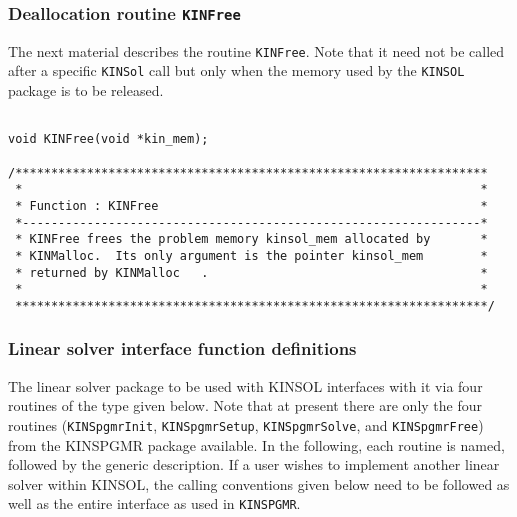 \documentclass[11pt]{article}
\begin{document}
\subsubsection{Deallocation routine {\tt KINFree}}

The next material describes the routine {\tt KINFree}. Note that it need
not be called after a specific {\tt KINSol} call but only when the
memory used by the {\tt KINSOL} package is to be released.

\small
\begin{verbatim}

void KINFree(void *kin_mem);
 
/******************************************************************
 *                                                                *
 * Function : KINFree                                             *
 *----------------------------------------------------------------*
 * KINFree frees the problem memory kinsol_mem allocated by       *
 * KINMalloc.  Its only argument is the pointer kinsol_mem        *
 * returned by KINMalloc   .                                      *
 *                                                                *
 ******************************************************************/
\end{verbatim}
\normalsize 

\subsubsection{Linear solver interface function definitions}


The linear solver package to be used with KINSOL interfaces with it 
via four routines of the type given below. Note that at present there
are only the four routines ({\tt KINSpgmrInit}, {\tt KINSpgmrSetup}, 
{\tt KINSpgmrSolve}, and {\tt KINSpgmrFree}) from the KINSPGMR package available.
In the following, each routine is named, followed by the generic description.
If a user wishes to implement another linear solver within KINSOL, the calling
conventions given below need to be followed as well as the entire interface
as used in {\tt KINSPGMR}.

\small
\end{document}
